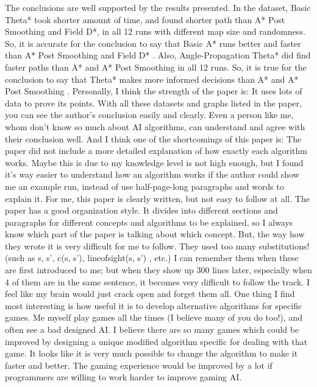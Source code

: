 \documentclass{article}
\begin{document}
\newline
\newline
The conclusions are well supported by the results presented. In the dataset, Basic Theta* took shorter amount of time, and found shorter path than A* Post Smoothing and Field D*, in all 12 runs with different map size and randomness. So, it is accurate for the conclusion to say that Basic A* runs better and faster than A* Post Smoothing and Field D* \cite{nash2007theta}. Also, Angle-Propagation Theta* did find faster paths than A* and A* Post Smoothing in all 12 runs. So, it is true for the conclusion to say that Theta* makes more informed decisions than A* and A* Post Smoothing \cite{nash2007theta}.
\newline
\newline
Personally, I think the strength of the paper is: It uses lots of data to prove its points. With all these datasets and graphs listed in the paper, you can see the author’s conclusion easily and clearly. Even a person like me, whom don’t know so much about AI algorithms, can understand and agree with their conclusion well. And I think one of the shortcomings of this paper is: The paper did not include a more detailed explanation of how exactly each algorithm works. Maybe this is due to my knowledge level is not high enough, but I found it’s way easier to understand how an algorithm works if the author could show me an example run, instead of use half-page-long paragraphs and words to explain it.
\newline
\newline
For me, this paper is clearly written, but not easy to follow at all. The paper has a good organization style. It divides into different sections and paragraphs for different concepts and algorithms to be explained, so I always know which part of the paper is talking about which concept. But, the way how they wrote it is very difficult for me to follow. They used too many substitutions! (such as s, s’, c(s, s’), lineofsight(s, s’) , etc.) I can remember them when these are first introduced to me; but when they show up 300 lines later, especially when 4 of them are in the same sentence, it becomes very difficult to follow the track. I feel like my brain would just crack open and forget them all.
\newline
\newline
One thing I find most interesting is how useful it is to develop alternative algorithms for specific games. Me myself play games all the times (I believe many of you do too!), and often see a bad designed AI. I believe there are so many games which could be improved by designing a unique modified algorithm specific for dealing with that game. It looks like it is very much possible to change the algorithm to make it faster and better. The gaming experience would be improved by a lot if programmers are willing to work harder to improve gaming AI.
\newline



\end{document}
